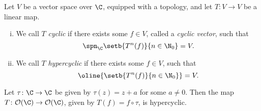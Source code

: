 
\begin{definicija}
Let $V$ be a vector space over $\C$, equipped with a topology, and
let $T \colon V \to V$ be a linear map.

\begin{enumerate}[i)]
\item We call $T$ \emph{cyclic} if there exists
some $f \in V$, called a \emph{cyclic vector},
such that
\[
\spn_\C \setb{T^n(f)}{n \in \N_0} = V.
\]
\item We call $T$ \emph{hypercyclic} if
there exists some $f \in V$, such that
\[
\oline{\setb{T^n(f)}{n \in \N_0}} = V.
\]
\end{enumerate}
\end{definicija}

\begin{izrek}[Birkhoff]
Let $\tau \colon \C \to \C$ be given by $\tau(z) = z + a$ for some
$a \ne 0$. Then the map
$T \colon \mathcal{O}(\C) \to \mathcal{O}(\C)$, given by
$T(f) = f \circ \tau$, is hypercyclic.
\end{izrek}

